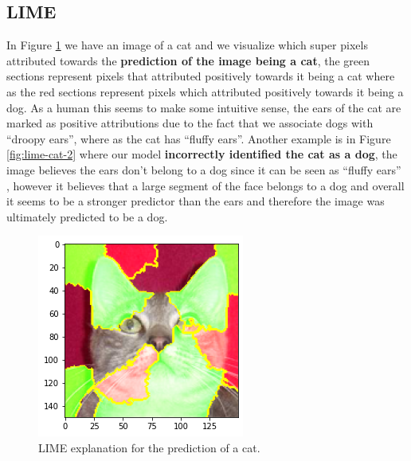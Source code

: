 \subsection{LIME}
 In Figure \ref{fig:lime-cat} we have an image of a cat and we visualize which super pixels attributed towards the \textbf{prediction of the image being a cat}, the green sections represent pixels that attributed positively towards it being a cat where as the red sections represent pixels which attributed positively towards it being a dog. As a human this seems to make some intuitive sense, the ears of the cat are marked as positive attributions due to the fact that we associate dogs with ``droopy ears'', where as the cat has ``fluffy ears''. Another example is in Figure \ref{fig:lime-cat-2} where our model \textbf{incorrectly identified the cat as a dog}, the image believes the ears don't belong to a dog since it can be seen as ``fluffy ears'' , however it believes that a large segment of the face belongs to a dog and overall it seems to be a stronger predictor than the ears and therefore the image was ultimately predicted to be a dog.
 
 \begin  {figure}[!htpb]
\centering
  \includegraphics[width=0.8\linewidth]{Evaluation_Images/cats_explain_2.png}
  \caption{LIME explanation for the prediction of a cat.}
  \label{fig:lime-cat}
\end{figure}

